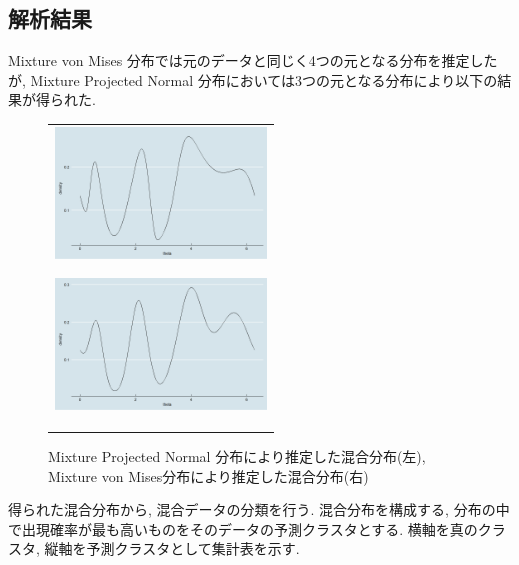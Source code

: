\documentclass[a4j,12pt]{jarticle}
\begin{document}
\subsection{解析結果}

Mixture von Mises 分布では元のデータと同じく4つの元となる分布を推定したが, Mixture Projected Normal 分布においては3つの元となる分布により以下の結果が得られた.

\begin{figure}[tbp]
 \begin{tabular}{c}
\hspace{0.5cm}
 \begin{minipage}{0.5\hsize}
  \begin{center}
   \includegraphics[clip,height= 35mm]{data/mix_pn.png}
  \end{center}
  \label{pnmix}
 \end{minipage}
\hspace{-1.0cm}
 \begin{minipage}{0.5\hsize}
  \begin{center}
   \includegraphics[clip,height= 35mm]{data/mix_von.png}
  \end{center}
  \label{vonmix}
 \end{minipage}
  \end{tabular}
\caption{Mixture Projected Normal 分布により推定した混合分布(左), Mixture von Mises分布により推定した混合分布(右)}
\end{figure}


得られた混合分布から, 混合データの分類を行う. 混合分布を構成する, 分布の中で出現確率が最も高いものをそのデータの予測クラスタとする.
横軸を真のクラスタ, 縦軸を予測クラスタとして集計表を示す. 
\end{document}
